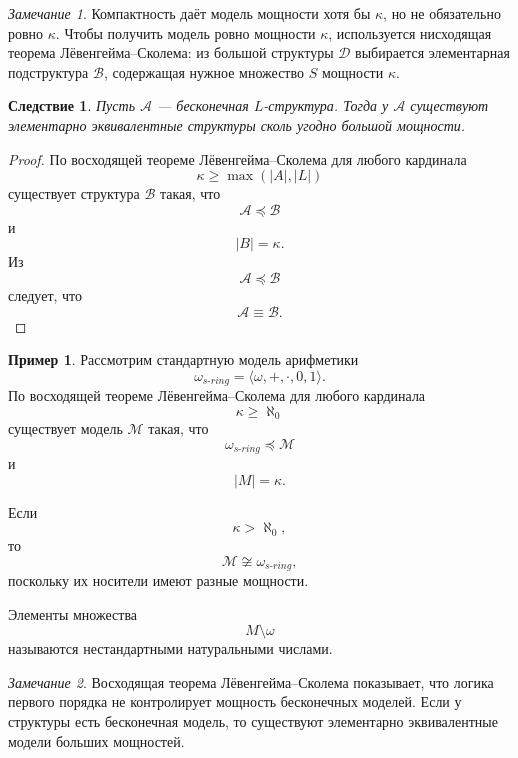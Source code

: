 \documentclass[12pt,a4paper,oneside,openany]{book}
\theoremstyle{definition}
\newtheorem{example}{Пример}[chapter]
\theoremstyle{plain}
\newtheorem{corollary}{Следствие}[chapter]
\theoremstyle{remark}
\newtheorem{remark}{Замечание}[chapter]
\begin{document}
\begin{remark}
Компактность даёт модель мощности хотя бы $\kappa$, но не обязательно ровно $\kappa$. Чтобы получить модель ровно мощности $\kappa$, используется нисходящая теорема Лёвенгейма--Сколема: из большой структуры $\mathcal D$ выбирается элементарная подструктура $\mathcal B$, содержащая нужное множество $S$ мощности $\kappa$.
\end{remark}

\begin{corollary}
Пусть $\mathcal A$ — бесконечная $L$-структура. Тогда у $\mathcal A$ существуют элементарно эквивалентные структуры сколь угодно большой мощности.
\end{corollary}

\begin{proof}
По восходящей теореме Лёвенгейма--Сколема для любого кардинала
\[
\kappa\ge\max(|A|,|L|)
\]
существует структура $\mathcal B$ такая, что
\[
\mathcal A\preccurlyeq\mathcal B
\]
и
\[
|B|=\kappa.
\]
Из
\[
\mathcal A\preccurlyeq\mathcal B
\]
следует, что
\[
\mathcal A\equiv\mathcal B.
\]
\end{proof}

\begin{example}
Рассмотрим стандартную модель арифметики
\[
\omega_{s\text{-}ring}
=
\langle\omega,+,\cdot,0,1\rangle.
\]
По восходящей теореме Лёвенгейма--Сколема для любого кардинала
\[
\kappa\ge\aleph_0
\]
существует модель $\mathcal M$ такая, что
\[
\omega_{s\text{-}ring}\preccurlyeq\mathcal M
\]
и
\[
|M|=\kappa.
\]

Если
\[
\kappa>\aleph_0,
\]
то
\[
\mathcal M\not\cong \omega_{s\text{-}ring},
\]
поскольку их носители имеют разные мощности.

Элементы множества
\[
M\setminus\omega
\]
называются нестандартными натуральными числами.
\end{example}

\begin{remark}
Восходящая теорема Лёвенгейма--Сколема показывает, что логика первого порядка не контролирует мощность бесконечных моделей. Если у структуры есть бесконечная модель, то существуют элементарно эквивалентные модели больших мощностей.
\end{remark}
\end{document}
